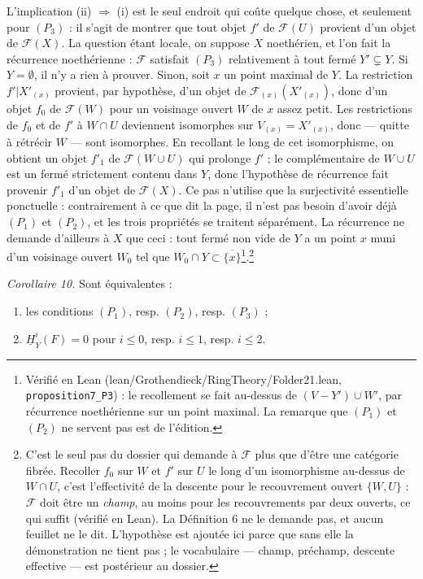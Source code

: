 \documentclass[11pt,a4paper]{article}
\begin{document}
L'implication (ii) $\Rightarrow$ (i) est le seul endroit qui coûte quelque
chose, et seulement pour $(P_{3})$ : il s'agit de montrer que tout objet $f'$ de
$\mathcal{F}(U)$ provient d'un objet de $\mathcal{F}(X)$. La question étant
locale, on suppose $X$ noethérien, et l'on fait la récurrence noethérienne :
$\mathcal{F}$ satisfait $(P_{3})$ relativement à tout fermé $Y' \subsetneq Y$.
Si $Y = \emptyset$, il n'y a rien à prouver. Sinon, soit $x$ un point maximal de
$Y$. La restriction $f'|X'_{(x)}$ provient, par hypothèse, d'un objet de
$\mathcal{F}_{(x)}(X'_{(x)})$, donc d'un objet $f_{0}$ de $\mathcal{F}(W)$ pour
un voisinage ouvert $W$ de $x$ assez petit. Les restrictions de $f_{0}$ et de
$f'$ à $W \cap U$ deviennent isomorphes sur $V_{(x)} = X'_{(x)}$, donc — quitte
à rétrécir $W$ — sont isomorphes. En recollant le long de cet isomorphisme, on
obtient un objet $f'_{1}$ de $\mathcal{F}(W \cup U)$ qui prolonge $f'$ ; le
complémentaire de $W \cup U$ est un fermé strictement contenu dans $Y$, donc
l'hypothèse de récurrence fait provenir $f'_{1}$ d'un objet de
$\mathcal{F}(X)$. Ce pas n'utilise que la surjectivité essentielle ponctuelle :
contrairement à ce que dit la page, il n'est pas besoin d'avoir déjà $(P_1)$ et
$(P_2)$, et les trois propriétés se traitent séparément. La récurrence ne
demande d'ailleurs à $X$ que ceci : tout fermé non vide de $Y$ a un point $x$
muni d'un voisinage ouvert $W_0$ tel que $W_0 \cap Y \subset
\overline{\{x\}}$\footnote{Vérifié en Lean (lean/Grothendieck/RingTheory/Folder21.lean,
\texttt{proposition7\_P3}) : le recollement se fait au-dessus de
$(V - Y') \cup W'$, par récurrence noethérienne sur un point maximal. La remarque
que $(P_1)$ et $(P_2)$ ne servent pas est de l'édition.}.\footnote{C'est le seul pas du dossier qui demande à
$\mathcal{F}$ plus que d'être une catégorie fibrée. Recoller $f_{0}$ sur $W$ et
$f'$ sur $U$ le long d'un isomorphisme au-dessus de $W \cap U$, c'est
l'effectivité de la descente pour le recouvrement ouvert $\{W, U\}$ :
$\mathcal{F}$ doit être un \emph{champ}, au moins pour les recouvrements par
deux ouverts, ce qui suffit (vérifié en Lean). La Définition 6 ne le demande
pas, et aucun feuillet ne le dit. L'hypothèse est ajoutée ici parce que sans elle la
démonstration ne tient pas ; le vocabulaire — champ, préchamp, descente
effective — est postérieur au dossier.}

\emph{Corollaire 10.} Sont équivalentes :
\begin{enumerate}
  \item[(i)] les conditions $(P_{1})$, resp. $(P_{2})$, resp. $(P_{3})$ ;
  \item[(ii)] $\underline{H}^{i}_{Y}(F) = 0$ pour $i \leqslant 0$, resp.
  $i \leqslant 1$, resp. $i \leqslant 2$.
\end{enumerate}
\end{document}
